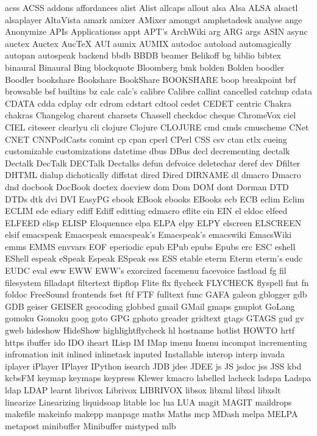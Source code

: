 acss
ACSS
addons
affordances
alist
Alist
allcaps
allout
alsa
Alsa
ALSA
alsactl
alsaplayer
AltaVista
amark
amixer
AMixer
amongst
amphetadesk
analyse
ange
Anonymize
APIs
Applicationss
appt
APT's
ArchWiki
arg
ARG
args
ASIN
async
auctex
Auctex
AucTeX
AUI
aumix
AUMIX
autodoc
autoload
automagically
autopan
autospeak
backend
bbdb
BBDB
beamer
Belikoff
bg
biblio
bibtex
binaural
Binaural
Bing
blockquote
Bloomberg
bmk
bolden
Bolden
boodler
Boodler
bookshare
Bookshare
BookShare
BOOKSHARE
boop
breakpoint
brf
browsable
bsf
builtins
bz
calc
calc's
calibre
Calibre
callint
cancelled
catchup
cdata
CDATA
cdda
cdplay
cdr
cdrom
cdstart
cdtool
cedet
CEDET
centric
Chakra
chakras
Changelog
charent
charsets
Chassell
checkdoc
cheque
ChromeVox
ciel
CIEL
citeseer
clearlyu
cli
clojure
Clojure
CLOJURE
cmd
cmds
cmuscheme
CNet
CNET
CNNPodCasts
comint
cp
cpan
cperl
CPerl
CSS
csv
ctan
ctlx
cueing
customizable
customizations
datetime
dbus
DBus
decl
decrementing
dectalk
Dectalk
DecTalk
DECTalk
Dectalks
defun
defvoice
deletechar
deref
dev
Dfilter
DHTML
dialup
dichotically
diffstat
dired
Dired
DIRNAME
dl
dmacro
Dmacro
dnd
docbook
DocBook
doctex
docview
dom
Dom
DOM
dont
Dorman
DTD
DTDs
dtk
dvi
DVI
EasyPG
ebook
EBook
ebooks
EBooks
ecb
ECB
eclim
Eclim
ECLIM
ede
ediary
ediff
Ediff
editting
edmacro
eflite
ein
EIN
el
eldoc
elfeed
ELFEED
elisp
ELISP
Eloquennce
elpa
ELPA
elpy
ELPY
elscreen
ELSCREEN
elsif
emacspeak
Emacspeak
emacspeak's
Emacspeak's
emacswiki
EmacsWiki
emms
EMMS
envvars
EOF
eperiodic
epub
EPub
epubs
Epubs
erc
ESC
eshell
EShell
espeak
eSpeak
Espeak
ESpeak
ess
ESS
etable
eterm
Eterm
eterm's
eudc
EUDC
eval
eww
EWW
EWW's
exorcized
facemenu
facevoice
fastload
fg
fil
filesystem
filladapt
filtertext
flipflop
Flite
flx
flycheck
FLYCHECK
flyspell
fmt
fn
foldoc
FreeSound
frontends
fset
ftf
FTF
fulltext
func
GAFA
galeon
gblogger
gdb
GDB
geiser
GEISER
geocoding
globbed
gmail
GMail
gmaps
gnuplot
GoLang
gomoku
Gomoku
goog
goto
GPG
gphoto
greader
gridtext
gtags
GTAGS
gud
gv
gweb
hideshow
HideShow
highlightflycheck
hl
hostname
hotlist
HOWTO
hrtf
https
ibuffer
ido
IDO
iheart
ILisp
IM
IMap
imenu
Imenu
incompat
incrementing
infromation
init
inlined
inlinetask
inputed
Installable
interop
interp
invada
iplayer
iPlayer
IPlayer
IPython
isearch
JDB
jdee
JDEE
js
JS
jsdoc
jss
JSS
kbd
kcbsFM
keymap
keymaps
keypress
Klewer
kmacro
labelled
lacheck
ladspa
Ladspa
ldap
LDAP
learnt
librivox
Librivox
LIBRIVOX
libsox
libxml
libxsl
libxslt
linearize
Linearizing
liquidsoap
litable
loc
lua
LUA
magit
MAGIT
maildrops
makefile
makeinfo
makepp
manpage
maths
Maths
mcp
MDash
melpa
MELPA
metapost
minibuffer
Minibuffer
mistyped
mlb
